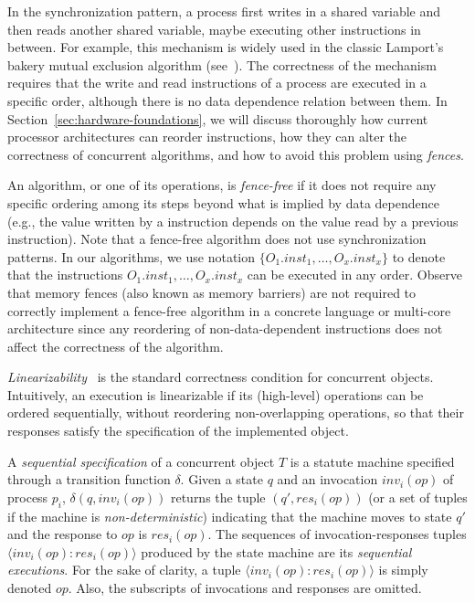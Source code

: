 In the \RAW{} synchronization pattern, a process first writes in a shared variable and then reads another shared variable, maybe executing other instructions in between. For example, this mechanism is widely used in the classic Lamport's bakery mutual exclusion algorithm (see~\cite {DBLP_books_daglib_0020056}). The correctness of the mechanism requires that the write and read instructions of a process are executed in a specific order, although there is no data dependence relation between them. In Section~\ref{sec:hardware-foundations}, we will discuss thoroughly how current processor architectures can reorder instructions, how they can alter the correctness of concurrent algorithms, and how to avoid this problem using \emph{fences}.

An algorithm, or one of its operations, is \emph{fence-free} if it does not require any specific ordering among its steps beyond what is implied by data dependence (e.g., the value written by a \W{} instruction depends on the value read by a previous \R instruction). Note that a fence-free algorithm does not use \RAW{} synchronization patterns. In our algorithms, we use notation \(\{O_1.inst_1, \ldots, O_x.inst_x\}\) to denote that the instructions \(O_1.inst_1, \ldots, O_x.inst_x\) can be executed in any order. Observe that memory fences (also known as memory barriers) are not required to correctly implement a fence-free algorithm in a concrete language or multi-core architecture since any reordering of non-data-dependent instructions does not affect the correctness of the algorithm.

\emph{Linearizability}~\cite{DBLP_journals_toplas_HerlihyW90} is the standard correctness condition for concurrent objects. Intuitively, an execution is linearizable if its (high-level) operations can be ordered sequentially, without reordering non-overlapping operations, so that their responses satisfy the specification of the implemented object.

A \emph{sequential specification} of a concurrent object \(T\) is a statute machine specified through a transition function \(\delta\). Given a state \(q\) and an invocation \(inv_i(op)\) of process \(p_i\), \(\delta(q, inv_i(op))\) returns the tuple \((q', res_i(op))\) (or a set of tuples if the machine is \emph{non-deterministic}) indicating that the machine moves to state \(q'\) and the response to \(op\) is \(res_i(op)\). The sequences of invocation-responses tuples \(\langle inv_i(op): res_i(op)\rangle\) produced by the state machine are its \emph{sequential executions}. For the sake of clarity, a tuple \(\langle inv_i(op): res_i(op)\rangle\) is simply denoted \(op\). Also, the subscripts of invocations and responses are omitted.

